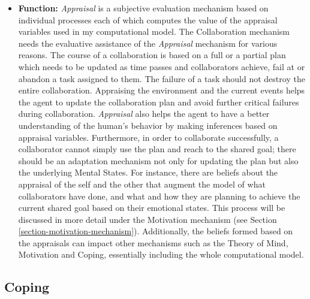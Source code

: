 \documentclass[12pt]{report}
\begin{document}
\begin{itemize}
  \item \textbf{Function:} \textit{Appraisal} is a subjective evaluation
  mechanism based on individual processes each of which computes the value of
  the appraisal variables used in my computational model. The Collaboration
  mechanism needs the evaluative assistance of the \textit{Appraisal} mechanism
  for various reasons. The course of a collaboration is based on a full or a
  partial plan which needs to be updated as time passes and collaborators
  achieve, fail at or abandon a task assigned to them. The failure of a task
  should not destroy the entire collaboration. Appraising the environment and
  the current events helps the agent to update the collaboration plan and avoid
  further critical failures during collaboration. \textit{Appraisal} also helps
  the agent to have a better understanding of the human's behavior by making
  inferences based on appraisal variables. Furthermore, in order to collaborate
  successfully, a collaborator cannot simply use the plan and reach to the
  shared goal; there should be an adaptation mechanism not only for updating the
  plan but also the underlying Mental States. For instance, there are beliefs
  about the appraisal of the self and the other that augment the model of what
  collaborators have done, and what and how they are planning to achieve the
  current shared goal based on their emotional states. This process will be
  discussed in more detail under the Motivation mechanism (see Section
  \ref{section-motivation-mechanism}). Additionally, the beliefs formed based on
  the appraisals can impact other mechanisms such as the Theory of Mind,
  Motivation and Coping, essentially including the whole computational model.
\end{itemize}

\subsection{Coping}
\end{document}
